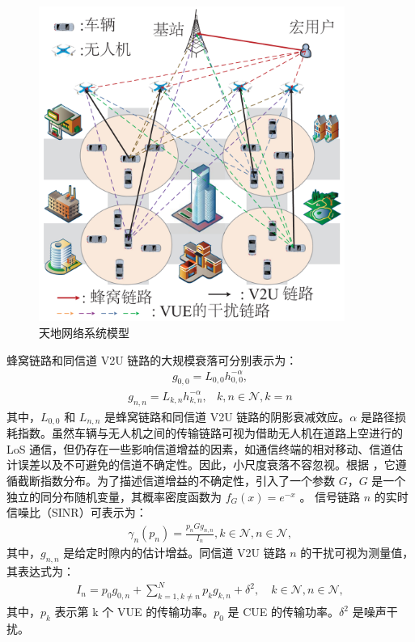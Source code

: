 \begin{figure}[H]
\centering
\includegraphics[width=10cm]{figures//chap2//china1.pdf}
\caption{天地网络系统模型}
\label{天地网络系统模型}
\end{figure}

蜂窝链路和同信道 V2U 链路的大规模衰落可分别表示为：
\begin{eqnarray}\label{3}
g_{0,0}=L_{0,0}h_{0,0}^{-\alpha},
\end{eqnarray}
\begin{eqnarray}\label{4}
g_{n,n}=L_{k,n}h_{k,n}^{-\alpha},          &k, n\in \mathcal{N}, k=n
\end{eqnarray}
其中，$L_{0,0}$ 和 $L_{n,n}$ 是蜂窝链路和同信道 V2U 链路的阴影衰减效应。$\alpha$ 是路径损耗指数。虽然车辆与无人机之间的传输链路可视为借助无人机在道路上空进行的 LoS 通信，但仍存在一些影响信道增益的因素，如通信终端的相对移动、信道估计误差以及不可避免的信道不确定性。因此，小尺度衰落不容忽视。根据 \cite{CCO}，它遵循截断指数分布。为了描述信道增益的不确定性，引入了一个参数 $G$，$G$ 是一个独立的同分布随机变量，其概率密度函数为 $f_G (x)=e^{-x}$ 。
信号链路 $n$ 的实时信噪比（SINR）可表示为：
\begin{eqnarray}\label{5}
\gamma_{n}(p_n)=\frac{p_{n}G g_{n,n}}{I_n}, k\in\mathcal{N},n\in\mathcal{N},
\end{eqnarray}
其中，$g_{n,n}$ 是给定时隙内的估计增益。同信道 V2U 链路 $n$ 的干扰可视为测量值，其表达式为：
\begin{eqnarray}\label{6}
I_n=p_0 g_{0,n}+\!\!\!\sum\limits_{k=1,k\neq n}^N\!\!\!\! p_k g_{k,n}+\delta^2, \quad k\in\mathcal{N},n\in\mathcal{N},
\end{eqnarray}
其中，$p_k$ 表示第 k 个 VUE 的传输功率。$p_0$ 是 CUE 的传输功率。$\delta^2$ 是噪声干扰。

